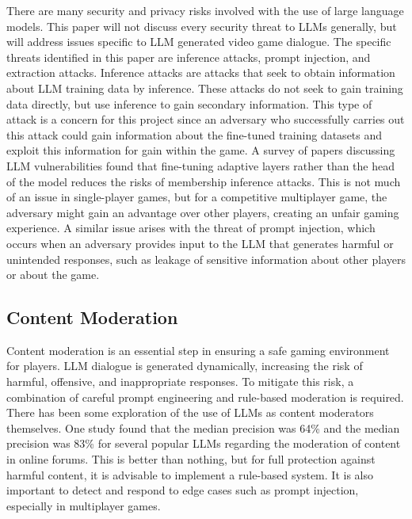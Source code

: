 \documentclass[10pt,twocolumn]{article}
\begin{document}
        \par 
        There are many security and privacy risks involved with the use of large language models. This paper will not discuss every security threat to LLMs generally, but will address issues specific to LLM generated video game dialogue. The specific threats identified in this paper are inference attacks, prompt injection, and extraction attacks. Inference attacks are attacks that seek to obtain information about LLM training data by inference\cite{model_leeching}. These attacks do not seek to gain training data directly, but use inference to gain secondary information. This type of attack is a concern for this project since an adversary who successfully carries out this attack could gain information about the fine-tuned training datasets and exploit this information for gain within the game. A survey of papers discussing LLM vulnerabilities found that fine-tuning adaptive layers rather than the head of the model reduces the risks of membership inference attacks\cite{llm_security_survey}. This is not much of an issue in single-player games, but for a competitive multiplayer game, the adversary might gain an advantage over other players, creating an unfair gaming experience. A similar issue arises with the threat of prompt injection, which occurs when an adversary provides input to the LLM that generates harmful or unintended responses, such as leakage of sensitive information about other players or about the game\cite{prompt_injection}.

    \subsection{Content Moderation}

        \par 
        Content moderation is an essential step in ensuring a safe gaming environment for players. LLM dialogue is generated dynamically, increasing the risk of harmful, offensive, and inappropriate responses. To mitigate this risk, a combination of careful prompt engineering and rule-based moderation is required. There has been some exploration of the use of LLMs as content moderators themselves. One study found that the median precision was 64\% and the median precision was 83\% for several popular LLMs regarding the moderation of content in online forums\cite{content_moderation}. This is better than nothing, but for full protection against harmful content, it is advisable to implement a rule-based system. It is also important to detect and respond to edge cases such as prompt injection, especially in multiplayer games. 
\end{document}
